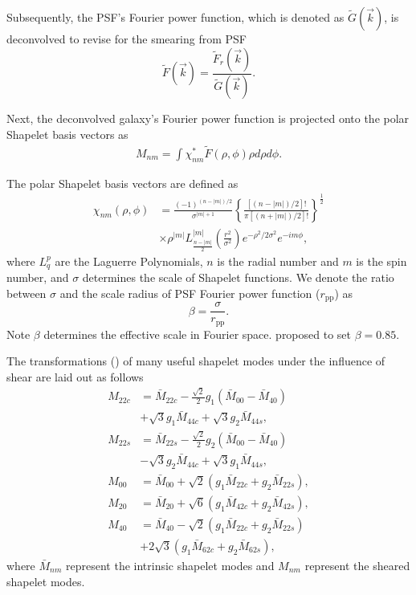 \documentclass[a4paper,fleqn,usenatbib]{mnras}
\begin{document}
Subsequently, the PSF's Fourier power function, which is denoted as
$\tilde{G}(\vec{k})$, is deconvolved to revise for the smearing from PSF
\begin{equation}\label{PSF deconvolution_fourier}
\tilde{F}(\vec{k})=\frac{\tilde{F}_r(\vec{k})}{\tilde{G}(\vec{k})}.
\end{equation}

Next, the deconvolved galaxy's Fourier power function is projected onto the
polar Shapelet basis vectors \citep{polar_Shapelets} as
\begin{align}\label{Shapelets_decompose}
M_{nm}=\int \chi_{nm}^{*} \tilde{F}(\rho,\phi) \rho d\rho d\phi.
\end{align}

The polar Shapelet basis vectors are defined as
\begin{align*}
\chi_{nm}(\rho,\phi)&=\frac{(-1)^{(n-|m|)/2}}{\sigma^{|m|+1}}\left\lbrace
    \frac{[(n-|m|)/2]!}{\pi[(n+|m|)/2]!}\right\rbrace^\frac{1}{2}\\
    &\times
    \rho^{|m|}L^{|m|}_{\frac{n-|m|}{2}}\left(\frac{r^2}{\sigma^2}\right)e^{-\rho^2/2\sigma^2}
    e^{-im\phi},
\end{align*}
where $L^{p}_{q}$ are the Laguerre Polynomials, $n$ is the radial number and
$m$ is the spin number, and $\sigma$ determines the scale of Shapelet
functions. We denote the ratio between $\sigma$ and the scale radius of PSF
Fourier power function ($r_{\text{pp}}$) as \citep{FPFS-Li2018}
\begin{equation}
\beta=\frac{\sigma}{r_{\text{pp}}}.
\end{equation}
Note $\beta$ determines the effective scale in Fourier space.
\citet{FPFS-Li2018} proposed to set $\beta=0.85$.


The transformations (\citep{polar_Shapelets}) of many useful shapelet modes under the influence of shear are laid out as follows
\begin{equation}\label{Shapelets_Moments_shear_Transform}
\begin{split}
M_{22c}&=\bar{M}_{22c}-\frac{\sqrt{2}}{2}g_1(\bar{M}_{00}-\bar{M}_{40})\\
&+\sqrt{3}g_1 \bar{M}_{44c}+\sqrt{3} g_2 \bar{M}_{44s},\\
M_{22s}&=\bar{M}_{22s}-\frac{\sqrt{2}}{2}g_2(\bar{M}_{00}-\bar{M}_{40})\\
&-\sqrt{3}g_2 \bar{M}_{44c}+\sqrt{3} g_1 \bar{M}_{44s},\\
M_{00} &=\bar{M}_{00}+\sqrt{2}(g_1\bar{M}_{22c}+g_2\bar{M}_{22s}),\\
M_{20} &=\bar{M}_{20}+\sqrt{6}(g_1\bar{M}_{42c}+g_2\bar{M}_{42s}),\\
M_{40} &=\bar{M}_{40}-\sqrt{2}(g_1\bar{M}_{22c}+g_2\bar{M}_{22s})\\
&+2\sqrt{3}(g_1\bar{M}_{62c}+g_2\bar{M}_{62s}),
\end{split}
\end{equation}
where $\bar{M}_{nm}$ represent the intrinsic shapelet modes and $M_{nm}$
represent the sheared shapelet modes.
\end{document}
